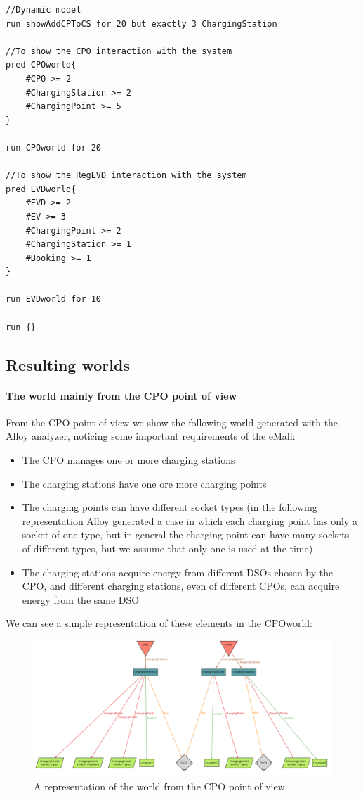 \begin{lstlisting}[frame = single]
//Dynamic model
run showAddCPToCS for 20 but exactly 3 ChargingStation

//To show the CPO interaction with the system
pred CPOworld{
	#CPO >= 2
	#ChargingStation >= 2
	#ChargingPoint >= 5
}

run CPOworld for 20

//To show the RegEVD interaction with the system
pred EVDworld{
	#EVD >= 2
	#EV >= 3
	#ChargingPoint >= 2
	#ChargingStation >= 1
	#Booking >= 1
}

run EVDworld for 10

run {} 
\end{lstlisting}

\subsection{Resulting worlds}
\paragraph{The world mainly from the CPO point of view}
From the CPO point of view we show the following world generated with the Alloy analyzer, noticing some important requirements of the eMall:
\begin{itemize}
    \item The CPO manages one or more charging stations
    \item The charging stations have one ore more charging points
    \item The charging points can have different socket types (in the following representation Alloy generated a case in which each charging point has only a socket of one type, but in general the charging point can have many sockets of different types, but we assume that only one is used at the time)
    \item The charging stations acquire energy from different DSOs chosen by the CPO, and different charging stations, even of different CPOs, can acquire energy from the same DSO 
\end{itemize}
We can see a simple representation of these elements in the CPOworld:
\begin{figure}[H]
    \centering
    \includegraphics[width=1\textwidth]{Images/cp4/CPOWorld.png}
    \caption{A representation of the world from the CPO point of view}
\end{figure}

